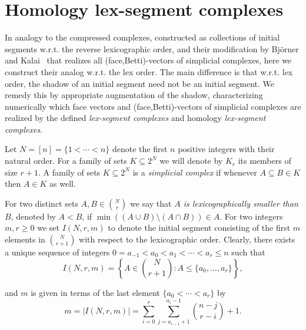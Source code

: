 \documentclass[reqno,english]{amsart}
\numberwithin{claimcounter}{theorem}
\theoremstyle{remark}
\theoremstyle{definition}
\numberwithin{theorem}{section}
\begin{document}



\appendix
\section{Homology lex-segment complexes}\label{apx:lex}
In analogy to the compressed complexes, constructed as collections of initial segments w.r.t. the reverse lexicographic order, and their modification by Bj\"{o}rner and Kalai~\cite{Bjorner-Kalai-ACTA} that realizes all (face,Betti)-vectors of simplicial complexes, here we construct their analog w.r.t. the lex order. The main difference is that w.r.t. lex order, the shadow of an initial segment need not be an initial segment. We remedy this by appropriate augmentation of the shadow, characterizing numerically which face vectors and (face,Betti)-vectors of simplicial complexes are realized  
by the defined \emph{lex-segment complexes} and homology \emph{lex-segment complexes}.


Let $N=[n]=\{1 < \cdots < n\}$ denote the first $n$ positive integers with their natural order.
For a family of sets $K \subseteq 2^N$ we will denote by $K_r$ its members of size $r+1$.
A family of sets $K \subseteq 2^N$ is a \emph{simplicial complex} if whenever $A\subseteq B\in K$ then $A\in K$ as well.

For two distinct sets $A,B\in \binom{N}{r}$ we say that \emph{$A$ is lexicographically smaller than $B$}, denoted by $A<B$, if $\min ((A\cup B)\setminus (A\cap B)) \in A$.
For two integers $m,r\geq 0$ we set $I(N,r,m)$ to denote the initial segment consisting of the first $m$ elements in $\binom{N}{r+1}$ with respect to the lexicographic order. 
Clearly, there exists a unique sequence of integers $0=a_{-1}<a_0< a_1< \cdots < a_r\leq n$ such that $$I(N,r,m) = \left \{A \in \binom{N}{r+1} \colon A \leq \{a_0,\dots,a_r \} \right \},$$

and $m$
is given in terms of the last element $\{a_0<\cdots<a_r\}$ by $$m=|I(N,r,m)| = \sum_{i=0}^r \sum_{j=a_{i-1}+1}^{a_i-1} \binom{n-j}{r-i} + 1.$$
\end{document}
